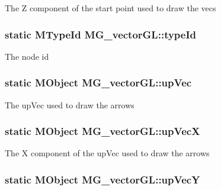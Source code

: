 The Z component of the start point used to draw the vecs \hypertarget{class_m_g__vector_g_l_acca8150a834863494fd5f1b00680289e}{
\subsubsection[{type\-Id}]{\setlength{\rightskip}{0pt plus 5cm}static M\-Type\-Id M\-G\-\_\-vector\-G\-L\-::type\-Id\hspace{0.3cm}{\ttfamily [static]}}}\label{class_m_g__vector_g_l_acca8150a834863494fd5f1b00680289e}
The node id \hypertarget{class_m_g__vector_g_l_a9fa637bb5b24532d768f5b8912c3f92e}{
\subsubsection[{up\-Vec}]{\setlength{\rightskip}{0pt plus 5cm}static M\-Object M\-G\-\_\-vector\-G\-L\-::up\-Vec\hspace{0.3cm}{\ttfamily [static]}}}\label{class_m_g__vector_g_l_a9fa637bb5b24532d768f5b8912c3f92e}
The up\-Vec used to draw the arrows \hypertarget{class_m_g__vector_g_l_a70c7ff57dc885d2fed64e61fa6dce7c4}{
\subsubsection[{up\-Vec\-X}]{\setlength{\rightskip}{0pt plus 5cm}static M\-Object M\-G\-\_\-vector\-G\-L\-::up\-Vec\-X\hspace{0.3cm}{\ttfamily [static]}}}\label{class_m_g__vector_g_l_a70c7ff57dc885d2fed64e61fa6dce7c4}
The X component of the up\-Vec used to draw the arrows \hypertarget{class_m_g__vector_g_l_abccaa6f4f93a98f68c0aec200763f6c5}{
\subsubsection[{up\-Vec\-Y}]{\setlength{\rightskip}{0pt plus 5cm}static M\-Object M\-G\-\_\-vector\-G\-L\-::up\-Vec\-Y\hspace{0.3cm}{\ttfamily [static]}}}\label{class_m_g__vector_g_l_abccaa6f4f93a98f68c0aec200763f6c5}
